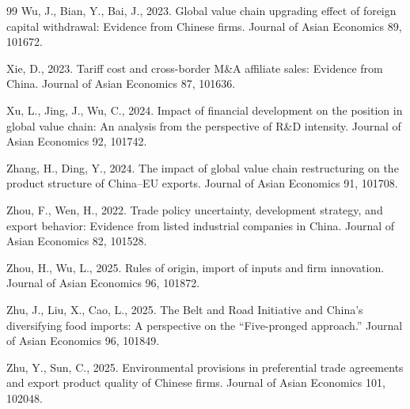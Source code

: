 \documentclass[preprint,12pt,authoryear]{elsarticle}
\begin{document}
\begin{thebibliography}{99}
Wu, J., Bian, Y., Bai, J., 2023. Global value chain upgrading effect of foreign capital withdrawal: Evidence from Chinese firms. Journal of Asian Economics 89, 101672.

Xie, D., 2023. Tariff cost and cross-border M\&A affiliate sales: Evidence from China. Journal of Asian Economics 87, 101636.

Xu, L., Jing, J., Wu, C., 2024. Impact of financial development on the position in global value chain: An analysis from the perspective of R\&D intensity. Journal of Asian Economics 92, 101742.

Zhang, H., Ding, Y., 2024. The impact of global value chain restructuring on the product structure of China--EU exports. Journal of Asian Economics 91, 101708.

Zhou, F., Wen, H., 2022. Trade policy uncertainty, development strategy, and export behavior: Evidence from listed industrial companies in China. Journal of Asian Economics 82, 101528.

Zhou, H., Wu, L., 2025. Rules of origin, import of inputs and firm innovation. Journal of Asian Economics 96, 101872.

Zhu, J., Liu, X., Cao, L., 2025. The Belt and Road Initiative and China's diversifying food imports: A perspective on the ``Five-pronged approach.'' Journal of Asian Economics 96, 101849.

Zhu, Y., Sun, C., 2025. Environmental provisions in preferential trade agreements and export product quality of Chinese firms. Journal of Asian Economics 101, 102048.

\end{thebibliography}
\end{document}
